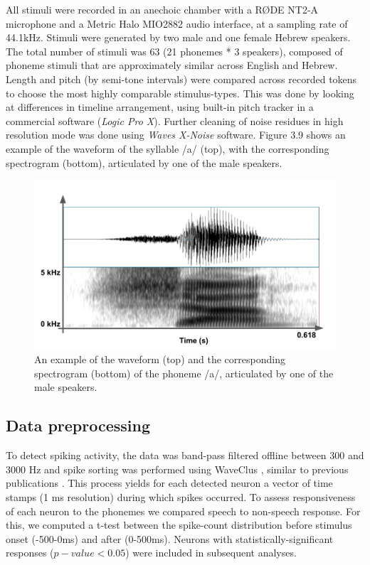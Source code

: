 All stimuli were recorded in an anechoic chamber with a RØDE NT2-A microphone and a Metric Halo MIO2882 audio interface, at a sampling rate of 44.1kHz. Stimuli were generated by two male and one female Hebrew speakers. The total number of stimuli was 63 (21 phonemes * 3 speakers), composed of phoneme stimuli that are approximately similar across English and Hebrew. Length and pitch (by semi-tone intervals) were compared across recorded tokens to choose the most highly comparable stimulus-types. This was done by looking at differences in timeline arrangement, using built-in pitch tracker in a commercial software (\textit{Logic Pro X}). Further cleaning of noise residues in high resolution mode was done using \textit{Waves X-Noise} software. Figure 3.9 shows an example of the waveform of the syllable /a/ (top), with the corresponding spectrogram (bottom), articulated by one of the male speakers. 

\begin{figure}[h]
\vspace{.3in}
\includegraphics[width=\linewidth]{Figures/Ch3/spectrogram_sha.png}
\caption{An example of the waveform (top) and the corresponding spectrogram (bottom) of the phoneme /a/, articulated by one of the male speakers.}
\end{figure}

\subsection{Data preprocessing}
To detect spiking activity, the data was band-pass filtered offline between 300 and 3000 Hz and spike sorting was performed using WaveClus \citep{quiroga2004unsupervised}, similar to previous publications \citep{quiroga2005invariant}. This process yields for each detected neuron a vector of time stamps (1 ms resolution) during which spikes occurred. To assess responsiveness of each neuron to the phonemes we compared speech to non-speech response. For this, we computed a t-test between the spike-count distribution before stimulus onset (-500-0ms) and after (0-500ms). Neurons with statistically-significant responses ($p-value<0.05$) were included in subsequent analyses. 

